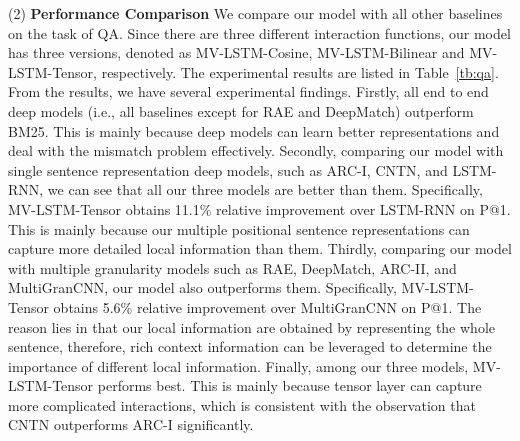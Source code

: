 \documentclass[letterpaper]{article}
\begin{document}
(2) {\bf Performance Comparison}
We compare our model with all other baselines on the task of QA. Since there are three different interaction functions, our model has three versions, denoted as MV-LSTM-Cosine, MV-LSTM-Bilinear and MV-LSTM-Tensor, respectively. The experimental results are listed in Table~\ref{tb:qa}.
From the results, we have several experimental findings. Firstly, all end to end deep models (i.e., all baselines except for RAE and DeepMatch) outperform BM25. This is mainly because deep models can learn better representations and deal with the mismatch problem effectively.
Secondly, comparing our model with single sentence representation deep models, such as ARC-I, CNTN, and LSTM-RNN, we can see that all our three models are better than them. Specifically, MV-LSTM-Tensor obtains 11.1\% relative improvement over LSTM-RNN on P@1.
This is mainly because our multiple positional sentence representations can capture more detailed local information than them. Thirdly, comparing our model with multiple granularity models such as RAE, DeepMatch, ARC-II, and MultiGranCNN, our model also outperforms them. Specifically, MV-LSTM-Tensor obtains 5.6\% relative improvement over MultiGranCNN on P@1.
The reason lies in that our local information are obtained by representing the whole sentence, therefore, rich context information can be leveraged to determine the importance of different local information. Finally, among our three models, MV-LSTM-Tensor performs best. This is mainly because tensor layer can capture more complicated interactions, which is consistent with the observation that CNTN outperforms ARC-I significantly.
\begin{table}[t]
\centering
\caption{Case study on QA to compare MV-LSTM with MultiGranCNN.}
\label{tb:casestudy}
\end{table}
\end{document}

